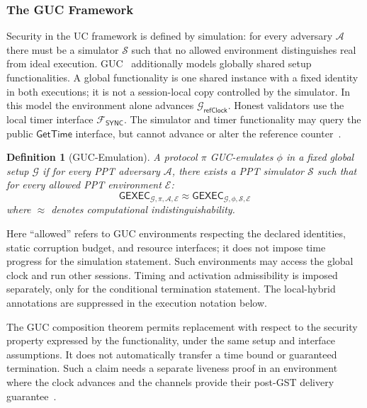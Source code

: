 \documentclass[conference,letterpaper,10pt]{IEEEtran}
\newtheorem{definition}{Definition}
\begin{document}
\subsubsection{The GUC Framework}

Security in the UC framework is defined by simulation: for every adversary $\mathcal{A}$ there must be a simulator $\mathcal{S}$ such that no allowed environment distinguishes real from ideal execution. GUC~\cite{canetti2007universally} additionally models globally shared setup functionalities. A global functionality is one shared instance with a fixed identity in both executions; it is not a session-local copy controlled by the simulator. In this model the environment alone advances $\mathcal{G}_{\scriptscriptstyle\mathsf{refClock}}$. Honest validators use the local timer interface $\mathcal{F}_{\scriptscriptstyle\mathsf{SYNC}}$. The simulator and timer functionality may query the public $\mathsf{GetTime}$ interface, but cannot advance or alter the reference counter~\cite{canetti2017universally}.

\begin{definition}[GUC-Emulation]\label{def-guc-emu}
A protocol $\pi$ GUC-emulates $\phi$ in a fixed global setup $\mathcal{G}$ if for every PPT adversary $\mathcal{A}$, there exists a PPT simulator $\mathcal{S}$ such that for every allowed PPT environment $\mathcal{E}$:
\[
\mathsf{GEXEC}_{\mathcal{G},\pi, \mathcal{A}, \mathcal{E}} \approx \mathsf{GEXEC}_{\mathcal{G},\phi, \mathcal{S}, \mathcal{E}}
\]
where $\approx$ denotes computational indistinguishability.
\end{definition}

Here ``allowed'' refers to GUC environments respecting the declared identities, static corruption budget, and resource interfaces; it does not impose time progress for the simulation statement. Such environments may access the global clock and run other sessions. Timing and activation admissibility is imposed separately, only for the conditional termination statement. The local-hybrid annotations are suppressed in the execution notation below.

The GUC composition theorem permits replacement with respect to the security property expressed by the functionality, under the same setup and interface assumptions. It does not automatically transfer a time bound or guaranteed termination. Such a claim needs a separate liveness proof in an environment where the clock advances and the channels provide their post-GST delivery guarantee~\cite{katz2013universally}.
\end{document}
